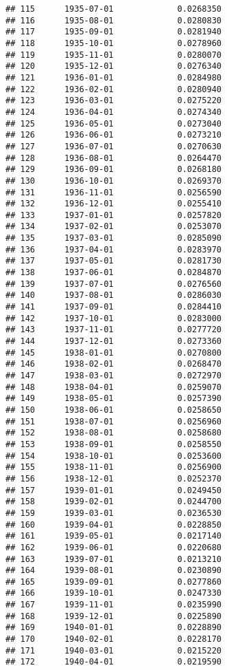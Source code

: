 \documentclass[
]{article}
\begin{document}
\begin{verbatim}
## 115      1935-07-01             0.0268350
## 116      1935-08-01             0.0280830
## 117      1935-09-01             0.0281940
## 118      1935-10-01             0.0278960
## 119      1935-11-01             0.0280070
## 120      1935-12-01             0.0276340
## 121      1936-01-01             0.0284980
## 122      1936-02-01             0.0280940
## 123      1936-03-01             0.0275220
## 124      1936-04-01             0.0274340
## 125      1936-05-01             0.0273040
## 126      1936-06-01             0.0273210
## 127      1936-07-01             0.0270630
## 128      1936-08-01             0.0264470
## 129      1936-09-01             0.0268180
## 130      1936-10-01             0.0269370
## 131      1936-11-01             0.0256590
## 132      1936-12-01             0.0255410
## 133      1937-01-01             0.0257820
## 134      1937-02-01             0.0253070
## 135      1937-03-01             0.0285090
## 136      1937-04-01             0.0283970
## 137      1937-05-01             0.0281730
## 138      1937-06-01             0.0284870
## 139      1937-07-01             0.0276560
## 140      1937-08-01             0.0286030
## 141      1937-09-01             0.0284410
## 142      1937-10-01             0.0283000
## 143      1937-11-01             0.0277720
## 144      1937-12-01             0.0273360
## 145      1938-01-01             0.0270800
## 146      1938-02-01             0.0268470
## 147      1938-03-01             0.0272970
## 148      1938-04-01             0.0259070
## 149      1938-05-01             0.0257390
## 150      1938-06-01             0.0258650
## 151      1938-07-01             0.0256960
## 152      1938-08-01             0.0258680
## 153      1938-09-01             0.0258550
## 154      1938-10-01             0.0253600
## 155      1938-11-01             0.0256900
## 156      1938-12-01             0.0252370
## 157      1939-01-01             0.0249450
## 158      1939-02-01             0.0244700
## 159      1939-03-01             0.0236530
## 160      1939-04-01             0.0228850
## 161      1939-05-01             0.0217140
## 162      1939-06-01             0.0220680
## 163      1939-07-01             0.0213210
## 164      1939-08-01             0.0230890
## 165      1939-09-01             0.0277860
## 166      1939-10-01             0.0247330
## 167      1939-11-01             0.0235990
## 168      1939-12-01             0.0225890
## 169      1940-01-01             0.0228890
## 170      1940-02-01             0.0228170
## 171      1940-03-01             0.0215220
## 172      1940-04-01             0.0219590

\end{verbatim}
\end{document}
